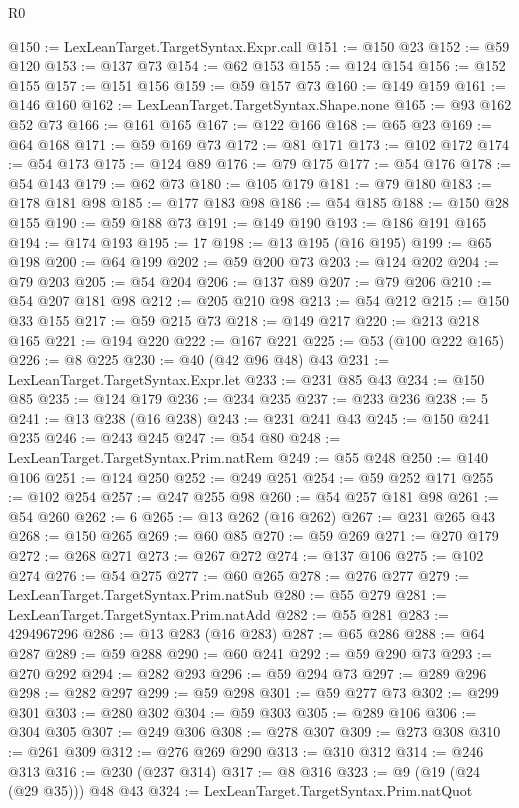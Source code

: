\begin{lexlean}{R0}
\begin{coremodule}
@150 := LexLeanTarget.TargetSyntax.Expr.call
@151 := @150 @23
@152 := @59 @120
@153 := @137 @73
@154 := @62 @153
@155 := @124 @154
@156 := @152 @155
@157 := @151 @156
@159 := @59 @157 @73
@160 := @149 @159
@161 := @146 @160
@162 := LexLeanTarget.TargetSyntax.Shape.none
@165 := @93 @162 @52 @73
@166 := @161 @165
@167 := @122 @166
@168 := @65 @23
@169 := @64 @168
@171 := @59 @169 @73
@172 := @81 @171
@173 := @102 @172
@174 := @54 @173
@175 := @124 @89
@176 := @79 @175
@177 := @54 @176
@178 := @54 @143
@179 := @62 @73
@180 := @105 @179
@181 := @79 @180
@183 := @178 @181 @98
@185 := @177 @183 @98
@186 := @54 @185
@188 := @150 @28 @155
@190 := @59 @188 @73
@191 := @149 @190
@193 := @186 @191 @165
@194 := @174 @193
@195 := 17
@198 := @13 @195 (@16 @195)
@199 := @65 @198
@200 := @64 @199
@202 := @59 @200 @73
@203 := @124 @202
@204 := @79 @203
@205 := @54 @204
@206 := @137 @89
@207 := @79 @206
@210 := @54 @207 @181 @98
@212 := @205 @210 @98
@213 := @54 @212
@215 := @150 @33 @155
@217 := @59 @215 @73
@218 := @149 @217
@220 := @213 @218 @165
@221 := @194 @220
@222 := @167 @221
@225 := @53 (@100 @222 @165)
@226 := @8 @225
@230 := @40 (@42 @96 @48) @43
@231 := LexLeanTarget.TargetSyntax.Expr.let
@233 := @231 @85 @43
@234 := @150 @85
@235 := @124 @179
@236 := @234 @235
@237 := @233 @236
@238 := 5
@241 := @13 @238 (@16 @238)
@243 := @231 @241 @43
@245 := @150 @241 @235
@246 := @243 @245
@247 := @54 @80
@248 := LexLeanTarget.TargetSyntax.Prim.natRem
@249 := @55 @248
@250 := @140 @106
@251 := @124 @250
@252 := @249 @251
@254 := @59 @252 @171
@255 := @102 @254
@257 := @247 @255 @98
@260 := @54 @257 @181 @98
@261 := @54 @260
@262 := 6
@265 := @13 @262 (@16 @262)
@267 := @231 @265 @43
@268 := @150 @265
@269 := @60 @85
@270 := @59 @269
@271 := @270 @179
@272 := @268 @271
@273 := @267 @272
@274 := @137 @106
@275 := @102 @274
@276 := @54 @275
@277 := @60 @265
@278 := @276 @277
@279 := LexLeanTarget.TargetSyntax.Prim.natSub
@280 := @55 @279
@281 := LexLeanTarget.TargetSyntax.Prim.natAdd
@282 := @55 @281
@283 := 4294967296
@286 := @13 @283 (@16 @283)
@287 := @65 @286
@288 := @64 @287
@289 := @59 @288
@290 := @60 @241
@292 := @59 @290 @73
@293 := @270 @292
@294 := @282 @293
@296 := @59 @294 @73
@297 := @289 @296
@298 := @282 @297
@299 := @59 @298
@301 := @59 @277 @73
@302 := @299 @301
@303 := @280 @302
@304 := @59 @303
@305 := @289 @106
@306 := @304 @305
@307 := @249 @306
@308 := @278 @307
@309 := @273 @308
@310 := @261 @309
@312 := @276 @269 @290
@313 := @310 @312
@314 := @246 @313
@316 := @230 (@237 @314)
@317 := @8 @316
@323 := @9 (@19 (@24 (@29 @35))) @48 @43
@324 := LexLeanTarget.TargetSyntax.Prim.natQuot

\end{coremodule}
\end{lexlean}
